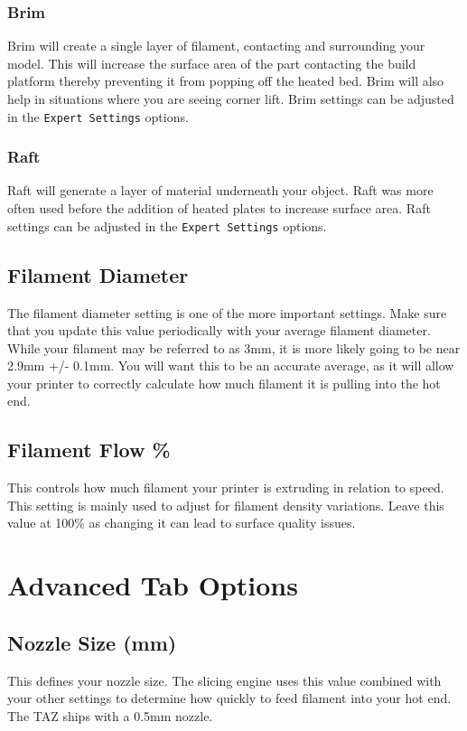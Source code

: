\subsubsection{Brim}
Brim will create a single layer of filament, contacting and surrounding your model. This will increase the surface area of the part contacting the build platform thereby preventing it from popping off the heated bed. Brim will also help in situations where you are seeing corner lift. Brim settings can be adjusted in the \texttt{Expert Settings} options.

\subsubsection{Raft}
Raft will generate a layer of material underneath your object. Raft was more often used before the addition of heated plates to increase surface area. Raft settings can be adjusted in the \texttt{Expert Settings} options.

\subsection{Filament Diameter}
The filament diameter setting is one of the more important settings. Make sure that you update this value periodically with your average filament diameter. While your filament may be referred to as 3mm, it is more likely going to be near 2.9mm +/- 0.1mm. You will want this to be an accurate average, as it will allow your printer to correctly calculate how much filament it is pulling into the hot end.

\subsection{Filament Flow \%}
This controls how much filament your printer is extruding in relation to speed. This setting is mainly used to adjust for filament density variations. Leave this value at 100\% as changing it can lead to surface quality issues.

\section{Advanced Tab Options}

\subsection{Nozzle Size (mm)}
This defines your nozzle size. The slicing engine uses this value combined with your other settings to determine how quickly to feed filament into your hot end. The TAZ ships with a 0.5mm nozzle. 

